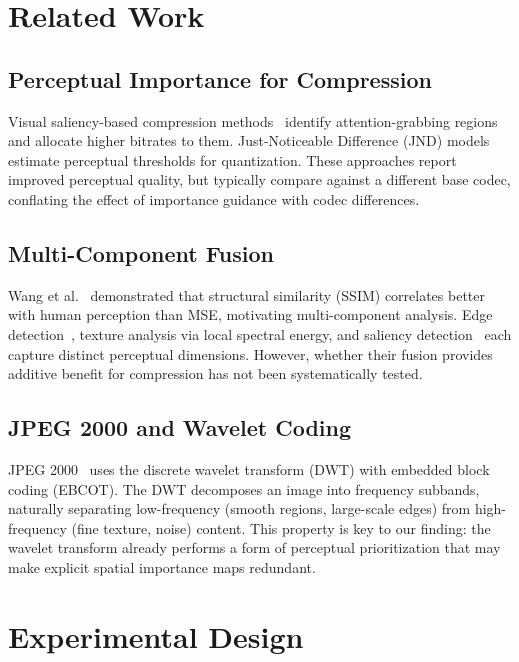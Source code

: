 \documentclass[conference]{IEEEtran}
\begin{document}
\section{Related Work}

\subsection{Perceptual Importance for Compression}

Visual saliency-based compression methods~\cite{guo2010visual} identify
attention-grabbing regions and allocate higher bitrates to them. Just-Noticeable
Difference (JND) models~\cite{wu2017just} estimate perceptual thresholds for
quantization. These approaches report improved perceptual quality, but
typically compare against a different base codec, conflating the effect of
importance guidance with codec differences.

\subsection{Multi-Component Fusion}

Wang et al.~\cite{wang2004image} demonstrated that structural similarity (SSIM)
correlates better with human perception than MSE, motivating multi-component
analysis. Edge detection~\cite{canny1986computational}, texture analysis via
local spectral energy, and saliency detection~\cite{hou2007saliency} each
capture distinct perceptual dimensions. However, whether their fusion provides
additive benefit for compression has not been systematically tested.

\subsection{JPEG 2000 and Wavelet Coding}

JPEG 2000~\cite{taubman2002jpeg2000} uses the discrete wavelet transform (DWT)
with embedded block coding (EBCOT). The DWT decomposes an image into
frequency subbands, naturally separating low-frequency (smooth regions,
large-scale edges) from high-frequency (fine texture, noise) content.
This property is key to our finding: the wavelet transform already performs
a form of perceptual prioritization that may make explicit spatial importance
maps redundant.

\section{Experimental Design}
\end{document}
